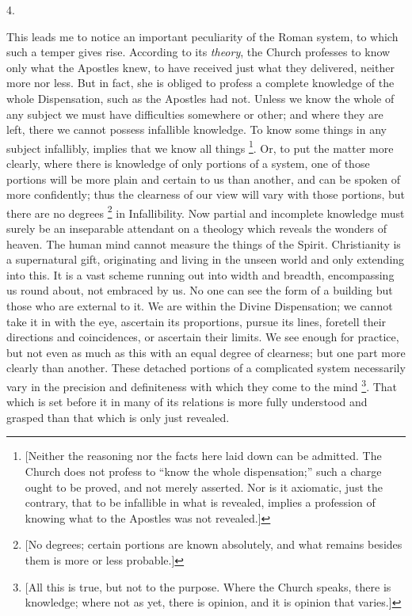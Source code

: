 4.

This leads me to notice an important peculiarity of the Roman
system, to which such a temper gives rise. According to its \emph{theory},
the Church professes to know only what the Apostles knew, to have
received just what they delivered, neither more nor less. But in fact,
she is obliged to profess a complete knowledge of the whole
Dispensation, such as the Apostles had not. Unless we know the whole
of any subject we must have difficulties somewhere or other; and where
they are left, there we cannot possess infallible knowledge. To know
some things in any subject infallibly, implies that we know all things
\footnote{[Neither the reasoning nor the facts here
laid down can be admitted. The Church does not profess to ``know
the whole dispensation;'' such a charge ought to be proved, and
not merely asserted. Nor is it axiomatic, just the contrary, that to
be infallible in what is revealed, implies a profession of knowing
what to the Apostles was not revealed.]}. Or, to put the matter
more clearly, where there is knowledge of only portions of a system,
one of those portions will be more plain and certain to us than
another, and can be spoken of more confidently; thus the clearness of
our view will vary with those portions, but there are no degrees \footnote{[No degrees; certain portions are known
absolutely, and what remains besides them is more or less probable.]} in Infallibility. Now partial and incomplete knowledge must
surely be an inseparable attendant on a theology which reveals the
wonders of heaven. The human mind cannot measure the things of the
Spirit. Christianity is a supernatural gift, originating and living in
the unseen world and only extending into this. It is a vast scheme
running out into width and breadth, encompassing us round about,
not embraced by us. No one can see the form of a building but those
who are external to it. We are within the Divine Dispensation; we
cannot take it in with the eye, ascertain its proportions, pursue its
lines, foretell their directions and coincidences, or ascertain their
limits. We see enough for practice, but not even as much as this with
an equal degree of clearness; but one part more clearly than another.
These detached portions of a complicated system necessarily vary in
the precision and definiteness with which they come to the mind \footnote{[All this is true, but not to the purpose.
Where the Church speaks, there is knowledge; where not as yet, there
is opinion, and it is opinion that varies.]}. That which is set before it in many of its relations is more
fully understood and grasped than that which is only just revealed.
